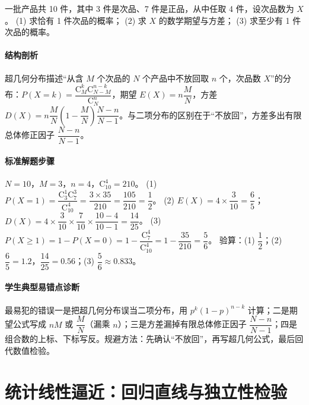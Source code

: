 \begin{problem}
一批产品共 10 件，其中 3 件是次品、7 件是正品，从中任取 4 件，设次品数为 $X$。
(1) 求恰有 1 件次品的概率；
(2) 求 $X$ 的数学期望与方差；
(3) 求至少有 1 件次品的概率。
\end{problem}
\begin{solution}
\paragraph{结构剖析}
超几何分布描述“从含 $M$ 个次品的 $N$ 个产品中不放回取 $n$ 个，次品数 $X$”的分布：$P(X=k)=\dfrac{\mathrm{C}_M^k\mathrm{C}_{N-M}^{n-k}}{\mathrm{C}_N^n}$，期望 $E(X)=n\dfrac MN$，方差 $D(X)=n\dfrac MN\left(1-\dfrac MN\right)\dfrac{N-n}{N-1}$。与二项分布的区别在于“不放回”，方差多出有限总体修正因子 $\dfrac{N-n}{N-1}$。
\paragraph{标准解题步骤}
$N=10$，$M=3$，$n=4$，$\mathrm{C}_{10}^4=210$。
(1) $P(X=1)=\dfrac{\mathrm{C}_3^1\mathrm{C}_7^3}{\mathrm{C}_{10}^4}=\dfrac{3\times35}{210}=\dfrac{105}{210}=\dfrac12$。
(2) $E(X)=4\times\dfrac{3}{10}=\dfrac65$；$D(X)=4\times\dfrac{3}{10}\times\dfrac{7}{10}\times\dfrac{10-4}{10-1}=\dfrac{14}{25}$。
(3) $P(X\ge1)=1-P(X=0)=1-\dfrac{\mathrm{C}_7^4}{\mathrm{C}_{10}^4}=1-\dfrac{35}{210}=\dfrac56$。
验算：(1) $\dfrac12$；(2) $\dfrac65=1.2$，$\dfrac{14}{25}=0.56$；(3) $\dfrac56\approx0.833$。
\paragraph{学生典型易错点诊断}
最易犯的错误一是把超几何分布误当二项分布，用 $p^k(1-p)^{n-k}$ 计算；二是期望公式写成 $nM$ 或 $\dfrac MN$（漏乘 $n$）；三是方差漏掉有限总体修正因子 $\dfrac{N-n}{N-1}$；四是组合数的上标、下标写反。规避方法：先确认“不放回”，再写超几何公式，最后回代数值检验。
\end{solution}

\section{统计线性逼近：回归直线与独立性检验}

